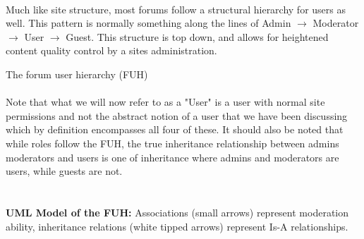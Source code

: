 \documentclass[]{article}
\begin{document}
\begin{minipage}{0.65\textwidth}
\paragraph{}
Much like site structure, most forums follow a structural hierarchy for users as well. This pattern is normally something along the lines of Admin $\to$ Moderator $\to$ User $\to$ Guest. This structure is top down, and allows for heightened content quality control by a sites administration.
\end{minipage}%
\hspace{0.5cm}
\vline
\hspace{0.5cm}
\begin{minipage}{0.35\textwidth}
\vspace{0.5 cm}
The forum user hierarchy (FUH)  
\end{minipage}%

\paragraph{}
Note that what we will now refer to as a "User" is a user with normal site permissions and not the abstract notion of a user that we have been discussing which by definition encompasses all four of these. It should also be noted that while roles follow the FUH, the true inheritance relationship between admins moderators and users is one of inheritance where admins and moderators are users, while guests are not.
\\\\\\
\textbf{UML Model of the FUH:} Associations (small arrows) represent moderation ability, inheritance relations (white tipped arrows) represent Is-A relationships.
\vspace{0.5 cm}
\begin{center}
\end{center}
\end{document}
